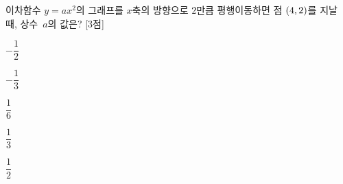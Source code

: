 이차함수 $y=ax^2$의 그래프를 $x$축의 방향으로 $2$만큼 평행이동하면 점 $(4{,}\mkern3mu 2)$를 지날 때, 상수~$a$의 값은? \mbox{[3점]}
\begin{choices32}{\rule[-3ex]{0pt}{8ex}$-\dfrac{1}{2}$}{\rule[-3ex]{0pt}{8ex}$-\dfrac{1}{3}$}{\rule[-3ex]{0pt}{8ex}$\dfrac{1}{6}$}{\rule[-3ex]{0pt}{8ex}$\dfrac{1}{3}$}{\rule[-3ex]{0pt}{8ex}$\dfrac{1}{2}$}\end{choices32}
